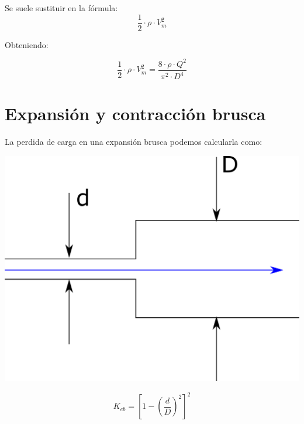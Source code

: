 \documentclass[10pt,a4paper]{article}
\begin{document}
Se suele sustituir en la fórmula:
$$
\frac{1}{2} \cdot \rho \cdot V_m^2
$$

Obteniendo:
\begin{center}
    \begin{tcolorbox}[colback=yellow!40!white, colframe=red!50!black, width=9cm,title=Sustituir $V_m^2$ por Q]
    $$
        \frac{1}{2} \cdot \rho \cdot V_m^2 = \frac{8 \cdot \rho \cdot Q^2}{\pi^2 \cdot D^4}
    $$
    \end{tcolorbox}
\end{center}

\newpage
\section{Expansión y contracción brusca}
La perdida de carga en una expansión brusca podemos calcularla como:
\begin{center}
    \includegraphics[scale = 0.5]{Expansion Brusca.png}
    \begin{tcolorbox}[colback=yellow!40!white, colframe=red!50!black, width=9cm,title=Expansión Brusca]
    $$
        K_{eb} = \left[ 1 - \left( \frac{d}{D} \right)^2 \right]^2
    $$
    \end{tcolorbox}
\end{center}
\end{document}
